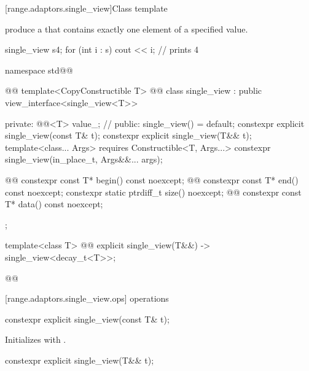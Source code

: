 [range.adaptors.single_view]{Class template }

\pnum
{}   produce a
 that contains exactly one element of a
specified value.

\pnum
\begin{example}
\begin{codeblock}
single_view s{4};
for (int i : s)
  cout << i; // prints 4
\end{codeblock}
\end{example}

\begin{codeblock}
namespace std@@ { @@
  template<CopyConstructible T>
    @@
  class single_view : public view_interface<single_view<T>> {
  private:
    @@<T> value_; // \expos
  public:
    single_view() = default;
    constexpr explicit single_view(const T& t);
    constexpr explicit single_view(T&& t);
    template<class... Args>
      requires Constructible<T, Args...>
    constexpr single_view(in_place_t, Args&&... args);

    @@
    constexpr const T* begin() const noexcept;
    @@
    constexpr const T* end() const noexcept;
    constexpr static ptrdiff_t size() noexcept;
    @@
    constexpr const T* data() const noexcept;
  };

  template<class T>
    @@
  explicit single_view(T&&) -> single_view<decay_t<T>>;
}@\oldtxt{\}}@
\end{codeblock}

[range.adaptors.single_view.ops]{ operations}

%
\begin{itemdecl}
constexpr explicit single_view(const T& t);
\end{itemdecl}

\begin{itemdescr}
\pnum
\effects Initializes  with .
\end{itemdescr}

%
\begin{itemdecl}
constexpr explicit single_view(T&& t);
\end{itemdecl}

